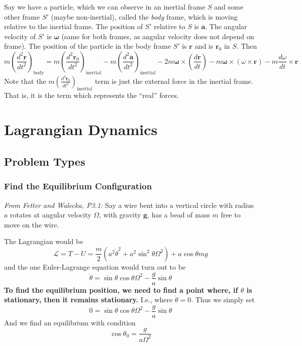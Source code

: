 \documentclass[25pt]{book}
\begin{document}
	Say we have a particle, which we can observe in an inertial frame $S$ and some other frame $S'$ (maybe non-inertial), called the \textit{body} frame, which is moving relative to the inertial frame. The position of $S'$ relative to $S$ is $\textbf{a}$. The angular velocity of $S'$ is $\bm{\omega}$ (same for both frames, as angular velocity does not depend on frame). The position of the particle in the body frame $S'$ is $\textbf{r}$ and is $\textbf{r}_0$ in $S$. Then
	\[
	m \left( \frac{d^2 \textbf{r}}{dt^2} \right)_{\text{body}} = m \left( \frac{d^2 \textbf{r}_0}{dt^2} \right)_{\text{inertial}}
	- m \left( \frac{d^2 \textbf{a}}{dt^2} \right)_{\text{inertial}} - 2 m \bm{\omega} \times \left( \frac{d \textbf{r}}{dt} \right) - m \bm{\omega} \times \left( \omega \times \textbf{r} \right) - m \frac{d\omega}{dt} \times \textbf{r}
	\]
	Note that the $m \left( \frac{d^2 \textbf{r}_0}{dt^2} \right)_{\text{inertial}}$ term is just the external force in the inertial frame. That is, it is the term which represents the ``real'' forces. 
	
	\chapter{Lagrangian Dynamics}
	
	\section{Problem Types}
	
	\subsection{Find the Equilibrium Configuration}
	
	\textit{From Fetter and Walecka, P3.1:} Say a wire bent into a vertical circle with radius $a$ rotates at angular velocity $\Omega$, with gravity $\textbf{g}$, has a bead of mass $m$ free to move on the wire. 
	
	The Lagrangian would be
	\[
	\mathcal{L} = T - U = \frac{m}{2}\left( a^2 \dot{\theta}^2 + a^2 \sin^2 \theta \Omega^2  \right) + a \cos \theta mg
	\]
	and the one Euler-Lagrange equation would turn out to be
	\[
	\ddot{\theta} = \sin \theta \cos \theta \Omega^2 - \frac{g}{a} \sin \theta
	\]
	\textbf{To find the equilibrium position, we need to find a point where, if $\theta$ is stationary, then it remains stationary.} I.e., where $\ddot{\theta} = 0$. Thus we simply set
	\[
	0 = \sin \theta \cos \theta \Omega^2 - \frac{g}{a} \sin \theta
	\]
	And we find an equilibrium with condition
	\[
	\cos \theta_0 = \frac{g}{a \Omega^2}
	\]
	
\end{document}
